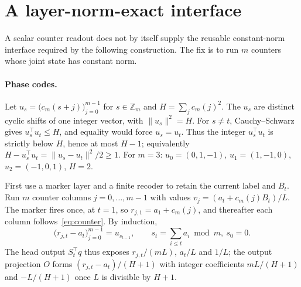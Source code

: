 \documentclass[10pt]{article}
\theoremstyle{remark}
\newcommand{\Z}{\mathbb Z}
\begin{document}
\section{A layer-norm-exact interface}\label{sec:interface}

A scalar counter readout does not by itself supply the reusable
constant-norm interface required by the following construction. The fix is to run $m$ counters whose joint state has constant norm.

\paragraph{Phase codes.} Let $u_s=\big(c_m(s+j)\big)_{j=0}^{m-1}$ for $s\in\Z_m$ and $H=\sum_j c_m(j)^2$. The $u_s$ are distinct cyclic shifts of one integer vector, with $\|u_s\|^2=H$. For $s\ne t$, Cauchy--Schwarz gives $u_s^\top u_t\le H$, and equality would force $u_s=u_t$. Thus the integer $u_s^\top u_t$ is strictly below $H$, hence at most $H-1$; equivalently $H-u_s^\top u_t=\|u_s-u_t\|^2/2\ge1$. For $m=3$: $u_0=(0,1,-1)$, $u_1=(1,-1,0)$, $u_2=(-1,0,1)$, $H=2$.

First use a marker layer and a finite recoder to retain the current label
and $B_t$. Run $m$ counter columns $j=0,\dots,m-1$ with values $v_j=(a_t+c_m(j)B_t)/L$. The marker fires once, at $t=1$, so $r_{j,1}=a_1+c_m(j)$, and thereafter each column follows~\eqref{eq:counter}. By induction,
\begin{equation}\label{eq:phase}
\big(r_{j,t}-a_t\big)_{j=0}^{m-1}=u_{s_{t-1}},\qquad s_t=\sum_{i\le t}a_i \bmod m,\ s_0=0.
\end{equation}
The head output $S_t^\top q$ thus exposes $r_{j,t}/(mL)$, $a_t/L$ and $1/L$; the output projection $O$ forms $(r_{j,t}-a_t)/(H+1)$ with integer coefficients $mL/(H+1)$ and $-L/(H+1)$ once $L$ is divisible by $H+1$.
\end{document}
